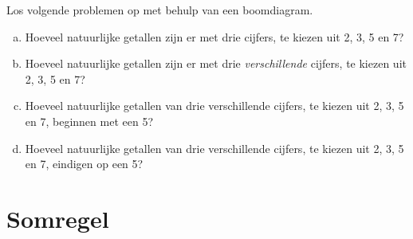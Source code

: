 \documentclass[12pt,twoside]{article}
\begin{document}
\begin{oefening}
Los volgende problemen op met behulp van een boomdiagram.
\begin{enumerate}[(a)]
  \item Hoeveel natuurlijke getallen zijn er met drie cijfers, te kiezen uit 2, 3, 5 en 7?
  \item Hoeveel natuurlijke getallen zijn er met drie {\em verschillende} cijfers, te kiezen uit 2, 3, 5 en 7?
  \item Hoeveel natuurlijke getallen van drie verschillende cijfers, te kiezen uit 2, 3, 5 en 7, beginnen met een 5?
  \item Hoeveel natuurlijke getallen van drie verschillende cijfers, te kiezen uit 2, 3, 5 en 7, eindigen op een 5?
\end{enumerate}
\end{oefening}

\pagebreak
\section{Somregel}
\end{document}
